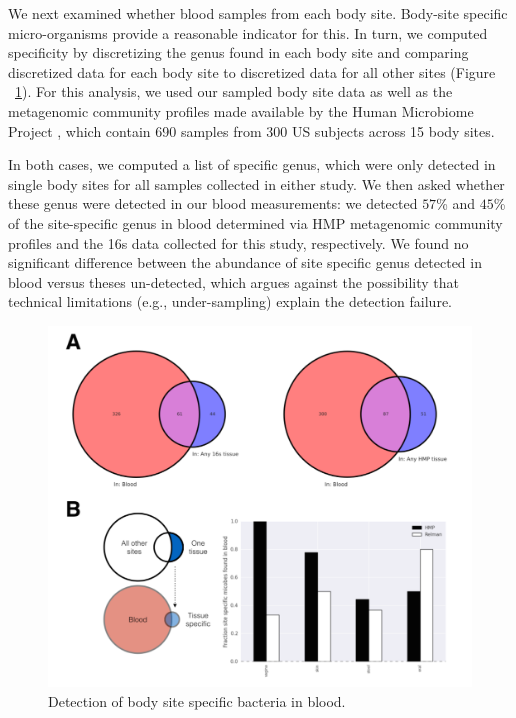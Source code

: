 We next examined whether blood samples from each body site. Body-site specific micro-organisms provide a reasonable indicator for this. In turn, we computed specificity by discretizing the genus found in each body site and comparing discretized data for each body site to discretized data for all other sites (Figure ~\ref{fig:Fig13}). For this analysis, we used our sampled body site data as well as the metagenomic community profiles made available by the Human Microbiome Project \cite{Consortium:2012bb}, which contain 690 samples from 300 US subjects across 15 body sites. 

In both cases, we computed a list of specific genus, which were only detected in single body sites for all samples collected in either study. We then asked whether these genus were detected in our blood measurements: we detected $57$\% and $45$\% of the site-specific genus in blood determined via HMP metagenomic community profiles and the 16s data collected for this study, respectively. We found no significant difference between the abundance of site specific genus detected in blood versus theses un-detected, which argues against the possibility that technical limitations (e.g., under-sampling) explain the detection failure.

\begin{figure}
\center\includegraphics[width=150mm,scale=0.5]{Figures/Fig13}
\caption{Detection of body site specific bacteria in blood.}
\label{fig:Fig13}
\end{figure}

